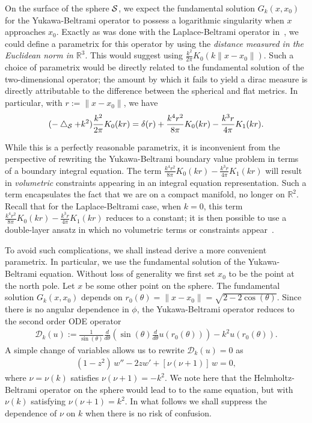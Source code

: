 On the surface of the sphere $\S$, we expect the fundamental solution
$G_k(x,x_{0})$ for the Yukawa-Beltrami operator to possess a
logarithmic singularity when $x$ approaches $x_{0}$. Exactly as was
done  with the Laplace-Beltrami operator in~\cite{gemmrich}, we could
define a parametrix for this operator by using the {\it distance
measured in the Euclidean norm in $\mathbb{R}^3$}. This would suggest
using $ \frac{k^2}{2\pi}K_0(k\|x-x_{0}\|)$.  Such a choice of
parametrix would be directly related to the fundamental solution of the
two-dimensional operator; the amount by which it fails to yield a dirac
measure is directly attributable to the difference between the
spherical and flat metrics.  In particular, with $r:=\|x-x_{0}\|$, we
have
\begin{align*}
  (-\lap_{\S} + k^{2})\frac{k^2}{2\pi}K_0(kr) = \delta(r) 
  +\frac{k^{4}r^{2}}{8\pi}K_{0}(kr) - \frac{k^{3}r}{4\pi}K_{1}(kr).
\end{align*}

While this is a perfectly reasonable parametrix, it is inconvenient
from the perspective of rewriting the Yukawa-Beltrami boundary value
problem in terms of a boundary integral equation. The term
$\frac{k^{4}r^{2}}{8\pi}K_{0}(kr) - \frac{k^{3}r}{4\pi}K_{1}(kr)$ will
result in {\it volumetric} constraints  appearing in an integral
equation representation. Such a term encapsulates the fact that we are
on a compact manifold, no longer on $\mathbb{R}^2$. Recall that for the
Laplace-Beltrami case, when $k=0$, this term
$\frac{k^{4}r^{2}}{8\pi}K_{0}(kr) - \frac{k^{3}r}{4\pi}K_{1}(kr)$
reduces to a constant; it is then possible to use a double-layer ansatz
in which no volumetric terms or constraints appear~\cite{kro:nig2013}.  

To avoid such complications, we shall instead derive a more convenient
parametrix.  In particular, we use the fundamental solution of the
Yukawa-Beltrami equation.  Without loss of generality we first set
$x_{0}$ to be the point at the north pole.  Let $x$ be some other point
on the sphere. The fundamental solution $G_k(x,x_0)$ depends on
$r_0(\theta)=\|x-x_0\|=\sqrt{2-2\cos(\theta)}$. Since there is no
angular dependence in $\phi$, the Yukawa-Beltrami operator reduces to
the second order ODE operator
\begin{align*}
  \mathcal{D}_k(u) := \frac{1}{\sin(\theta)}
  \frac{d}{d\theta}\left(\sin(\theta)
  \frac{d}{d\theta}u(r_0(\theta))\right)-k^2 u(r_{0}(\theta)).
\end{align*}
A simple change of variables allows us to rewrite $\mathcal{D}_k (u)=0$
as 
\begin{align}
  (1-z^2)\,w'' -2zw' + \left[\nu(\nu+1)\right]\,w = 0,
  \label{LegendrePequation}
\end{align}
where $\nu = \nu(k)$ satisfies $\nu(\nu + 1) = -k^2$. We note here that
the Helmholtz-Beltrami operator on the sphere would lead to to the same
equation, but with $\nu(k)$ satisfying $\nu(\nu+1)=k^{2}$. In what
follows we shall suppress the dependence of $\nu$ on $k$ when there is
no risk of confusion.

